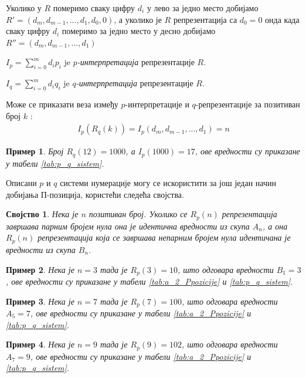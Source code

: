 \documentclass[a4paper]{article}
\newtheorem{example}{Пример}
\newtheorem{property}{Својство}
\begin{document}
Уколико у $ R $ померимо сваку цифру $ d_{i} $ у лево за једно место добијамо $ R' = (d_{m}, d_{m-1}, ... , d_{1}, d_{0}, 0) $, а уколико је $ R $ репрезентација са $ d_{0} = 0 $ онда када сваку цифру $ d_{i} $ померимо за једно место у десно добијамо $ R'' = (d_{m}, d_{m-1}, ... , d_{1}) $ 

$ I_{p} = \sum_{i=0}^{m} d_{i}p_{i} $ je \textit{$ p $-интерпретација} репрезентације $ R $.

$ I_{q} = \sum_{i=0}^{m} d_{i}q_{i} $ je \textit{$ q $-интерпретација} репрезентације $ R $.

Може се приказати веза између $ p $-интерпретације и $ q $-репрезентације за позитиван број $ k $ :
\begin{eqnarray}
	I_{p}(R_{q}(k)) = I_{p}(d_{m}, d_{m-1}, ..., d_{1}) = n
\end{eqnarray} 

\begin{example}
	Број $ R_{q}(12) = 1000 $, а $ I_{p}(1000) = 17 $, ове вредности су приказане у табели \ref{tab:p_q_sistem}.
\end{example}

Описани $ p $ и $ q $ системи нумерације могу се искористити за још један начин добијања П-позиција, користећи следећа својства.

\begin{property}
	\label{prop:r_p_nule}
	Нека је $ n $ позитиван број. Уколико се $ R_p(n) $ репрезентација завршава парним бројем нула она је идентична вредности из скупа $ A_{n} $, а она $ R_p(n) $ репрезентација која се завршава непарним бројем нула идентичана је вредности из скупа $ B_{n} $.
\end{property}

\begin{example}
	Нека је $ n = 3 $ тада је $ R_{p}(3) = 10 $, што одговара вредности $ B_{1} = 3 $, ове вредности су приказане у табели \ref{tab:a_2_Ppozicije} и \ref{tab:p_q_sistem}.
\end{example}

\begin{example}
	Нека је $ n = 7 $ тада је $ R_{p}(7) = 100 $, што одговара вредности $ A_{5} = 7 $, ове вредности су приказане у табели \ref{tab:a_2_Ppozicije} и \ref{tab:p_q_sistem}.
\end{example}

\begin{example}
	Нека је $ n = 9 $ тада је $ R_{p}(9) = 102 $, што одговара вредности $ A_{7} = 9 $, ове вредности су приказане у табели \ref{tab:a_2_Ppozicije} и \ref{tab:p_q_sistem}.
\end{example}
\end{document}
